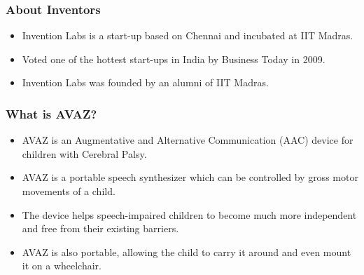 \documentclass[12pt]{beamer}
\begin{document}
{
\begin{frame}
	\frametitle{About Inventors}
	\begin{itemize}
		\item Invention Labs is a start-up based on Chennai and incubated at IIT Madras.
		\item Voted one of the hottest start-ups in India by Business Today in 2009.
		\item Invention Labs was founded by an alumni of IIT Madras.
	\end{itemize}
\end{frame}
}
\begin{frame}
	\frametitle{What is AVAZ?}
	\begin{itemize}
		\item AVAZ is an Augmentative and Alternative Communication (AAC) device for children with Cerebral Palsy.
		\item AVAZ is a portable speech synthesizer which can be controlled by gross motor movements of a child.
		\item The device helps speech-impaired children to become much more independent and free from their existing barriers.
		\item AVAZ is also portable, allowing the child to carry it around and even mount it on a wheelchair.
	\end{itemize}
\end{frame}
\end{document}
